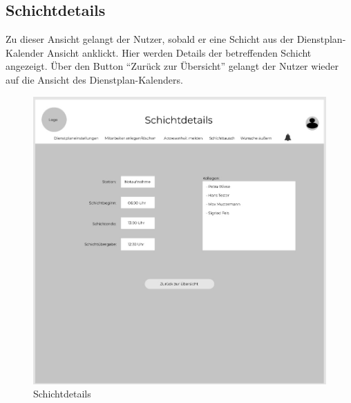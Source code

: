 \documentclass[11pt,
paper=a4,
bibtotocnumbered,	  %
liststotocnumbered,  %
DIV=calc,		  %
tablecaptionabove,	  %
headinclude,
]{article}
\begin{document}
\subsection{Schichtdetails}
Zu dieser Ansicht gelangt der Nutzer, sobald er eine Schicht aus der Dienstplan-Kalender Ansicht anklickt. Hier werden Details der betreffenden Schicht angezeigt. Über den Button “Zurück zur Übersicht” gelangt der Nutzer wieder auf die Ansicht des Dienstplan-Kalenders. 
\begin{figure}[H]
\includegraphics[width=1\textwidth]{Bilder/Schichtdetails.jpg}
\caption{Schichtdetails}
\end{figure}
\end{document}
